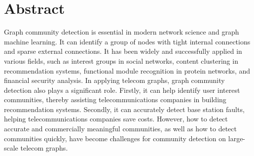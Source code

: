 \documentclass[ %
                    author={Tengyao Tu},
                supervisor={Dr. James Pope},
                    degree={MSc},
                     title={A New Perspective on Graph Community Detection: Combining Traditional Methods with Deep Learning Approaches},
                  subtitle={Applying to Telecom Networks and Diverse Datasets},
                      type={},
                      year={2024}]{dissertation}
\begin{document}
\maketitle







\frontmatter


\makedecl


\tableofcontents
\listoffigures
\listoftables
\listofalgorithms



\chapter*{Abstract}
Graph community detection is essential in modern network science and graph machine learning. It can identify a group of nodes with tight internal connections and sparse external connections. It has been widely and successfully applied in various fields, such as interest groups in social networks, content clustering in recommendation systems, functional module recognition in protein networks, and financial security analysis. In applying telecom graphs, graph community detection also plays a significant role. Firstly, it can help identify user interest communities, thereby assisting telecommunications companies in building recommendation systems. Secondly, it can accurately detect base station faults, helping telecommunications companies save costs. However, how to detect accurate and commercially meaningful communities, as well as how to detect communities quickly, have become challenges for community detection on large-scale telecom graphs. 
\end{document}
